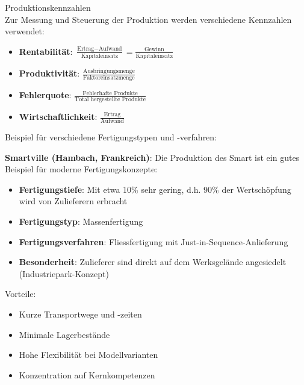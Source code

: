 \begin{definition}{Produktionskennzahlen}\\
Zur Messung und Steuerung der Produktion werden verschiedene Kennzahlen verwendet:
\begin{itemize}
    \item \textbf{Rentabilität}: $\frac{\text{Ertrag} - \text{Aufwand}}{\text{Kapitaleinsatz}} = \frac{\text{Gewinn}}{\text{Kapitaleinsatz}}$
    \item \textbf{Produktivität}: $\frac{\text{Ausbringungsmenge}}{\text{Faktoreinsatzmenge}}$
    \item \textbf{Fehlerquote}: $\frac{\text{Fehlerhafte Produkte}}{\text{Total hergestellte Produkte}}$
    \item \textbf{Wirtschaftlichkeit}: $\frac{\text{Ertrag}}{\text{Aufwand}}$
\end{itemize}
\end{definition}

\begin{example}
Beispiel für verschiedene Fertigungstypen und -verfahren:

\textbf{Smartville (Hambach, Frankreich)}:
Die Produktion des Smart ist ein gutes Beispiel für moderne Fertigungskonzepte:
\begin{itemize}
    \item \textbf{Fertigungstiefe}: Mit etwa 10\% sehr gering, d.h. 90\% der Wertschöpfung wird von Zulieferern erbracht
    \item \textbf{Fertigungstyp}: Massenfertigung
    \item \textbf{Fertigungsverfahren}: Fliessfertigung mit Just-in-Sequence-Anlieferung
    \item \textbf{Besonderheit}: Zulieferer sind direkt auf dem Werksgelände angesiedelt (Industriepark-Konzept)
\end{itemize}

Vorteile:
\begin{itemize}
    \item Kurze Transportwege und -zeiten
    \item Minimale Lagerbestände
    \item Hohe Flexibilität bei Modellvarianten
    \item Konzentration auf Kernkompetenzen
\end{itemize}
\end{example}

